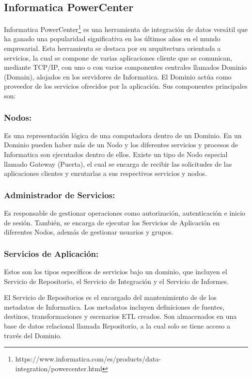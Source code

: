 \subsection{Informatica PowerCenter}

Informatica PowerCenter\footnote{https://www.informatica.com/es/products/data-integration/powercenter.html} es una herramienta de integración de datos versátil que ha ganado una popularidad significativa 
en los últimos años en el mundo empresarial. Esta herramienta se destaca por su arquitectura orientada a servicios, 
la cual se compone de varias aplicaciones cliente que se comunican, mediante TCP/IP, con uno o con varios componentes 
centrales llamados Dominio (Domain), alojados en los servidores de Informatica. El Dominio actúa como proveedor de los 
servicios ofrecidos por la aplicación. Sus componentes principales son: 

\subsubsection{Nodos:} 

Es una representación lógica de una computadora dentro de un Dominio. En un Dominio pueden haber m\'as de un Nodo y 
los diferentes servicios y procesos de Informatica son ejecutados dentro de ellos. Existe un tipo de Nodo especial 
llamado Gateway (Puerta), el cual se encarga de recibir las solicitudes de las aplicaciones clientes y enrutarlas a sus 
respectivos servicios y nodos.

\subsubsection{Administrador de Servicios:} 

Es responsable de gestionar operaciones como autorización, autenticación e inicio de sesión. También, se encarga de 
ejecutar los Servicios de Aplicaci\'on en diferentes Nodos, además de gestionar usuarios y grupos.

\subsubsection{Servicios de Aplicaci\'on:}

Estos son los tipos específicos de servicios bajo un dominio, que incluyen el Servicio de Repositorio, el Servicio de 
Integración y el Servicio de Informes.

El Servicio de Repositorios es el encargado del mantenimiento de de los metadatos de Informatica. Los metadatos incluyen 
definiciones de fuentes, destinos, transformaciones y escenarios ETL creados. Son almacenados en una base de datos 
relacional llamada Repositorio, a la cual solo se tiene acceso a través del Dominio.

